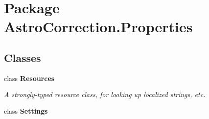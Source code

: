 \section{Package AstroCorrection.Properties}
\label{namespace_astro_correction_1_1_properties}
\subsection*{Classes}
\begin{DoxyCompactItemize}
\item 
class {\bf Resources}
\begin{DoxyCompactList}\small\item\em A strongly-\/typed resource class, for looking up localized strings, etc. \item\end{DoxyCompactList}\item 
class {\bf Settings}
\end{DoxyCompactItemize}
